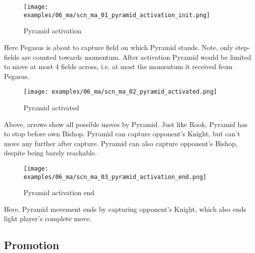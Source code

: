 \noindent
\begin{figure}[!h]
\texttt{[image: examples/06\_ma/scn\_ma\_01\_pyramid\_activation\_init.png]}
\caption{Pyramid activation}
\label{fig:scn_ma_01_pyramid_activation_init}
\end{figure}

Here Pegasus is about to capture field on which Pyramid stands. Note, only
step-fields are counted towards momentum. After activation Pyramid would be
limited to move at most 4 fields across, i.e. at most the momentum it received
from Pegasus.

\clearpage %

\noindent
\begin{figure}[!h]
\texttt{[image: examples/06\_ma/scn\_ma\_02\_pyramid\_activated.png]}
\caption{Pyramid activated}
\label{fig:scn_ma_02_pyramid_activated}
\end{figure}

Above, arrows show all possible moves by Pyramid. Just like Rook, Pyramid has to
stop before own Bishop. Pyramid can capture opponent's Knight, but can't move any
further after capture. Pyramid can also capture opponent's Bishop, despite being
barely reachable.

\clearpage %

\noindent
\begin{figure}[!h]
\texttt{[image: examples/06\_ma/scn\_ma\_03\_pyramid\_activation\_end.png]}
\caption{Pyramid activation end}
\label{fig:scn_ma_03_pyramid_activation_end}
\end{figure}

Here, Pyramid movement ends by capturing opponent's Knight, which also ends light
player's complete move.

\clearpage %

\subsection*{Promotion}
\label{sec:Mayan Ascendancy/Pyramid/Promotion}

